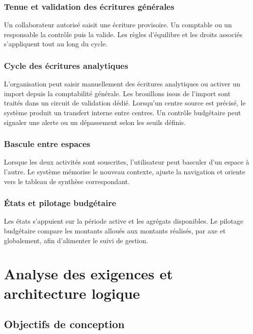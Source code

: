 \documentclass[12pt,a4paper]{report}
\begin{document}
\subsection{Tenue et validation des écritures générales}

Un collaborateur autorisé saisit une écriture provisoire. Un comptable ou un responsable la contrôle puis la valide. Les règles d'équilibre et les droits associés s'appliquent tout au long du cycle.

\subsection{Cycle des écritures analytiques}

L'organisation peut saisir manuellement des écritures analytiques ou activer un import depuis la comptabilité générale. Les brouillons issus de l'import sont traités dans un circuit de validation dédié. Lorsqu'un centre source est précisé, le système produit un transfert interne entre centres. Un contrôle budgétaire peut signaler une alerte ou un dépassement selon les seuils définis.

\subsection{Bascule entre espaces}

Lorsque les deux activités sont souscrites, l'utilisateur peut basculer d'un espace à l'autre. Le système mémorise le nouveau contexte, ajuste la navigation et oriente vers le tableau de synthèse correspondant.

\subsection{États et pilotage budgétaire}

Les états s'appuient sur la période active et les agrégats disponibles. Le pilotage budgétaire compare les montants alloués aux montants réalisés, par axe et globalement, afin d'alimenter le suivi de gestion.

\chapter{Analyse des exigences et architecture logique}

\section{Objectifs de conception}
\end{document}
